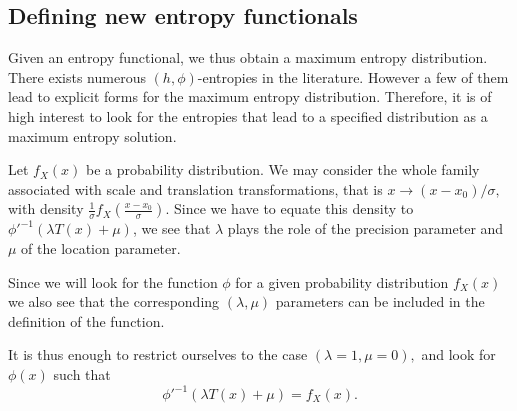 \documentclass[english,onecolumn]{elsarticle}
\begin{document}
\subsection{Defining new entropy functionals}

Given an entropy functional, we thus obtain a maximum entropy distribution.
There exists numerous $(h,\phi)$-entropies in the literature. However
a few of them lead to explicit forms for the maximum entropy distribution.
Therefore, it is of high interest to look for the entropies that lead
to a specified distribution as a maximum entropy solution. 

Let $f_{X}(x)$ be a probability distribution. We may consider the
whole family associated with scale and translation transformations,
that is $x\rightarrow\left(x-x_{0}\right)/\sigma,$ with density $\frac{1}{\sigma}f_{X}\left(\frac{x-x_{0}}{\sigma}\right).$
Since we have to equate this density to $\phi'^{-1}\left(\lambda T(x)+\mu\right)$,
we see that $\lambda$ plays the role of the precision parameter and
$\mu$ of the location parameter. 

Since we will look for the function $\phi$ for a given probability
distribution $f_{X}(x)$ we also see that the corresponding $(\lambda,\mu)$
parameters can be included in the definition of the function. 

It is thus enough to restrict ourselves to the case $(\lambda=1,\mu=0),$
and look for $\phi(x)$ such that 
\begin{equation}
\phi'^{-1}\left(\lambda T(x)+\mu\right)=f_{X}(x).\label{eq:aresoudre}
\end{equation}
\end{document}

